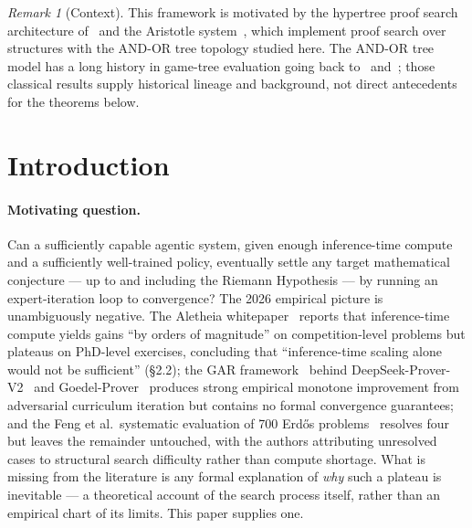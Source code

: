\documentclass[reqno,11pt]{amsart}
\theoremstyle{plain}
\theoremstyle{definition}
\theoremstyle{remark}
\newtheorem{remark}[theorem]{Remark}
\begin{document}
\maketitle

\begin{remark}[Context]
This framework is motivated by the hypertree proof search architecture of~\citet{Lample2022} and the Aristotle system~\citep{Aristotle2024}, which implement proof search over structures with the AND-OR tree topology studied here. The AND-OR tree model has a long history in game-tree evaluation going back to~\citet{Pearl1982} and~\citet{Tarsi1983}; those classical results supply historical lineage and background, not direct antecedents for the theorems below.
\end{remark}

\section{Introduction}

\paragraph{Motivating question.} Can a sufficiently capable agentic system, given enough inference-time compute and a sufficiently well-trained policy, eventually settle any target mathematical conjecture --- up to and including the Riemann Hypothesis --- by running an expert-iteration loop to convergence? The 2026 empirical picture is unambiguously negative. The Aletheia whitepaper~\citep{AletheiaWhitepaper2026} reports that inference-time compute yields gains ``by orders of magnitude'' on competition-level problems but plateaus on PhD-level exercises, concluding that ``inference-time scaling alone would not be sufficient'' (\S2.2); the GAR framework~\citep{GAR2025} behind DeepSeek-Prover-V2~\citep{DeepSeekProver2024} and Goedel-Prover~\citep{GoedelProver2025} produces strong empirical monotone improvement from adversarial curriculum iteration but contains no formal convergence guarantees; and the Feng et al.\ systematic evaluation of 700 Erd\H{o}s problems~\citep{FengErdos2026} resolves four but leaves the remainder untouched, with the authors attributing unresolved cases to structural search difficulty rather than compute shortage. What is missing from the literature is any formal explanation of \emph{why} such a plateau is inevitable --- a theoretical account of the search process itself, rather than an empirical chart of its limits. This paper supplies one.
\end{document}
